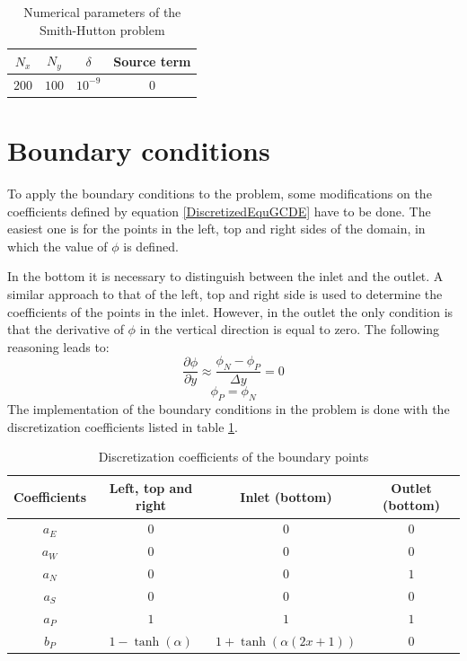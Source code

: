 \begin{table}[h]
	\centering
	\begin{tabular}{ |c|c|c|c| }
		\hline
		$N_{x}$ & $N_{y}$ & $\delta$ & Source term \\ \hline
		$200$ & $100$ & $10^{-9}$ & $0$ \\ \hline
	\end{tabular}
\caption{Numerical parameters of the Smith-Hutton problem}
\end{table}

\section{Boundary conditions}
To apply the boundary conditions to the problem, some modifications on the coefficients defined by equation \ref{DiscretizedEquGCDE} have to be done. The easiest one is for the points in the left, top and right sides of the domain, in which the value of $\phi$ is defined.

In the bottom it is necessary to distinguish between the inlet and the outlet. A similar approach to that of the left, top and right side is used to determine the coefficients of the points in the inlet. However, in the outlet the only condition is that the derivative of $\phi$ in the vertical direction is equal to zero. The following reasoning leads to:
\begin{equation}
\frac{\partial\phi}{\partial y}\approx\frac{\phi_{N}-\phi_{P}}{\Delta y}=0
\end{equation}
\begin{equation}
\phi_{P}=\phi_{N}
\end{equation}
The implementation of the boundary conditions in the problem is done with the discretization coefficients listed in table \ref{BoundaryCondSH}.
\begin{table}[h]
	\centering
	\begin{tabular}{ |c|c|c|c| }
		\hline
		Coefficients & Left, top and right & Inlet (bottom) & Outlet (bottom) \\ \hline
		$a_{E}$ & $0$ & $0$ & $0$ \\ \hline
		$a_{W}$ & $0$ & $0$ & $0$ \\ \hline
		$a_{N}$ & $0$ & $0$ & $1$ \\ \hline
		$a_{S}$ & $0$ & $0$ & $0$ \\ \hline
		$a_{P}$ & $1$ & $1$ & $1$ \\ \hline
		$b_{P}$ & $1-\tanh\left(\alpha\right)$ & $1+\tanh\left(\alpha\left(2x+1\right)\right)$ & $0$ \\ \hline
	\end{tabular}
\caption{Discretization coefficients of the boundary points}
\label{BoundaryCondSH}
\end{table}


